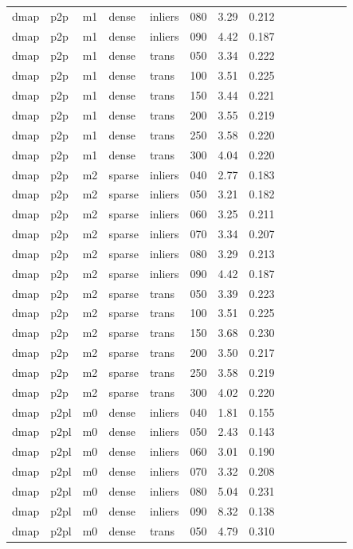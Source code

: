 \begin{table}[htbp]
\begin{tabular}{llllllrrrrrrrr}
  dmap & p2p & m1 & dense & inliers & 080 & 3.29 & 0.212 \\
  dmap & p2p & m1 & dense & inliers & 090 & 4.42 & 0.187 \\
  dmap & p2p & m1 & dense & trans & 050 & 3.34 & 0.222 \\
  dmap & p2p & m1 & dense & trans & 100 & 3.51 & 0.225 \\
  dmap & p2p & m1 & dense & trans & 150 & 3.44 & 0.221 \\
  dmap & p2p & m1 & dense & trans & 200 & 3.55 & 0.219 \\
  dmap & p2p & m1 & dense & trans & 250 & 3.58 & 0.220 \\
  dmap & p2p & m1 & dense & trans & 300 & 4.04 & 0.220 \\
  dmap & p2p & m2 & sparse & inliers & 040 & 2.77 & 0.183 \\
  dmap & p2p & m2 & sparse & inliers & 050 & 3.21 & 0.182 \\
  dmap & p2p & m2 & sparse & inliers & 060 & 3.25 & 0.211 \\
  dmap & p2p & m2 & sparse & inliers & 070 & 3.34 & 0.207 \\
  dmap & p2p & m2 & sparse & inliers & 080 & 3.29 & 0.213 \\
  dmap & p2p & m2 & sparse & inliers & 090 & 4.42 & 0.187 \\
  dmap & p2p & m2 & sparse & trans & 050 & 3.39 & 0.223 \\
  dmap & p2p & m2 & sparse & trans & 100 & 3.51 & 0.225 \\
  dmap & p2p & m2 & sparse & trans & 150 & 3.68 & 0.230 \\
  dmap & p2p & m2 & sparse & trans & 200 & 3.50 & 0.217 \\
  dmap & p2p & m2 & sparse & trans & 250 & 3.58 & 0.219 \\
  dmap & p2p & m2 & sparse & trans & 300 & 4.02 & 0.220 \\
  dmap & p2pl & m0 & dense & inliers & 040 & 1.81 & 0.155 \\
  dmap & p2pl & m0 & dense & inliers & 050 & 2.43 & 0.143 \\
  dmap & p2pl & m0 & dense & inliers & 060 & 3.01 & 0.190 \\
  dmap & p2pl & m0 & dense & inliers & 070 & 3.32 & 0.208 \\
  dmap & p2pl & m0 & dense & inliers & 080 & 5.04 & 0.231 \\
  dmap & p2pl & m0 & dense & inliers & 090 & 8.32 & 0.138 \\
  dmap & p2pl & m0 & dense & trans & 050 & 4.79 & 0.310 \\

\end{tabular}
\end{table}
